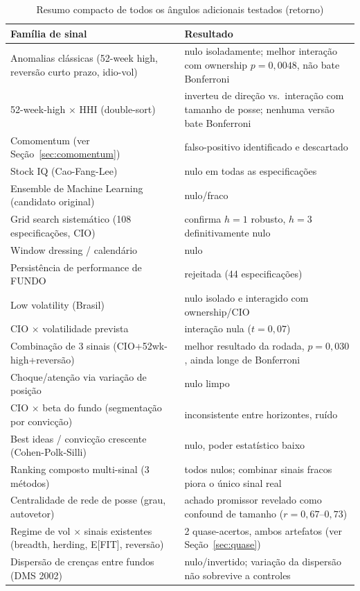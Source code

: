 \documentclass[11pt,a4paper]{article}
\begin{document}
\begin{longtable}{@{}p{5.5cm}p{7.2cm}@{}}
\caption{Resumo compacto de todos os ângulos adicionais testados (retorno)}\\
\toprule
Família de sinal & Resultado \\
\midrule
\endhead
Anomalias clássicas (52-week high, reversão curto prazo, idio-vol) & nulo isoladamente; melhor interação com ownership $p=0{,}0048$, não bate Bonferroni \\
52-week-high $\times$ HHI (double-sort) & inverteu de direção vs.\ interação com tamanho de posse; nenhuma versão bate Bonferroni \\
Comomentum (ver Seção~\ref{sec:comomentum}) & falso-positivo identificado e descartado \\
Stock IQ (Cao-Fang-Lee) & nulo em todas as especificações \\
Ensemble de Machine Learning (candidato original) & nulo/fraco \\
Grid search sistemático (108 especificações, CIO) & confirma $h=1$ robusto, $h=3$ definitivamente nulo \\
Window dressing / calendário & nulo \\
Persistência de performance de FUNDO & rejeitada (44 especificações) \\
Low volatility (Brasil) & nulo isolado e interagido com ownership/CIO \\
CIO $\times$ volatilidade prevista & interação nula ($t=0{,}07$) \\
Combinação de 3 sinais (CIO+52wk-high+reversão) & melhor resultado da rodada, $p=0{,}030$, ainda longe de Bonferroni \\
Choque/atenção via variação de posição & nulo limpo \\
CIO $\times$ beta do fundo (segmentação por convicção) & inconsistente entre horizontes, ruído \\
Best ideas / convicção crescente (Cohen-Polk-Silli) & nulo, poder estatístico baixo \\
Ranking composto multi-sinal (3 métodos) & todos nulos; combinar sinais fracos piora o único sinal real \\
Centralidade de rede de posse (grau, autovetor) & achado promissor revelado como confound de tamanho ($r=0{,}67$--$0{,}73$) \\
Regime de vol $\times$ sinais existentes (breadth, herding, E[FIT], reversão) & 2 quase-acertos, ambos artefatos (ver Seção~\ref{sec:quase}) \\
Dispersão de crenças entre fundos (DMS 2002) & nulo/invertido; variação da dispersão não sobrevive a controles \\

\end{longtable}
\end{document}
